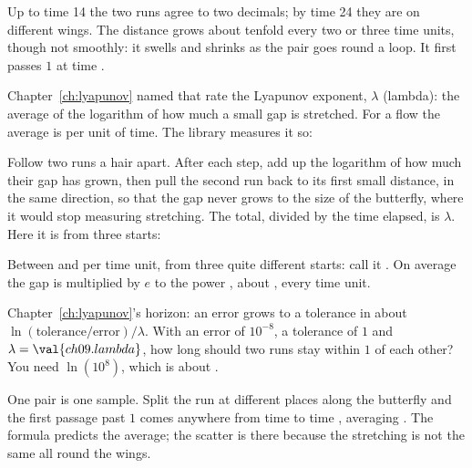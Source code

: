 
\noindent
Up to time 14 the two runs agree to two decimals; by time 24 they are on
different wings. The distance grows about tenfold every two or three time
units, though not smoothly: it swells and shrinks as the pair goes round a
loop. It first passes $1$ at time .

Chapter~\ref{ch:lyapunov} named that rate the Lyapunov exponent, $\lambda$
(lambda): the average of the logarithm of how much a small gap is stretched.
For a flow the average is per unit of time. The library measures it so:


\noindent
Follow two runs a hair apart. After each step, add up the logarithm of how
much their gap has grown, then pull the second run back to its first small
distance, in the same direction, so that the gap never grows to the size of
the butterfly, where it would stop measuring stretching. The total, divided
by the time elapsed, is $\lambda$. Here it is from three starts:



\noindent
Between  and  per time unit, from
three quite different starts: call it . On average the gap
is multiplied by $e$ to the power , about ,
every time unit.

\begin{think}
Chapter~\ref{ch:lyapunov}'s horizon: an error grows to a tolerance in about
$\ln(\text{tolerance} / \text{error}) / \lambda$. With an error of $10^{-8}$,
a tolerance of $1$ and $\lambda = \val{ch09.lambda}$, how long should two runs
stay within $1$ of each other? You need $\ln(10^{8})$, which is about
.
\end{think}
One pair is one sample. Split the run at  different
places along the butterfly and the first passage past $1$ comes anywhere from
time  to time , averaging
. The formula predicts the average; the scatter is there
because the stretching is not the same all round the wings.

